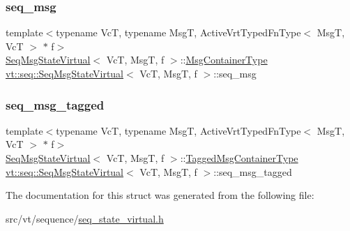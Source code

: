 \subsubsection{\texorpdfstring{seq\+\_\+msg}{seq\_msg}}
{\footnotesize\ttfamily template$<$typename VcT, typename MsgT, Active\+Vrt\+Typed\+Fn\+Type$<$ Msg\+T, Vc\+T $>$ $\ast$ f$>$ \\
\hyperlink{structvt_1_1seq_1_1_seq_msg_state_virtual}{Seq\+Msg\+State\+Virtual}$<$ VcT, MsgT, f $>$\+::\hyperlink{structvt_1_1seq_1_1_seq_msg_state_virtual_a04ba59629edd91369fb4dcb17784c370}{Msg\+Container\+Type} \hyperlink{structvt_1_1seq_1_1_seq_msg_state_virtual}{vt\+::seq\+::\+Seq\+Msg\+State\+Virtual}$<$ VcT, MsgT, f $>$\+::seq\+\_\+msg\hspace{0.3cm}{\ttfamily [static]}}

\mbox{\label{structvt_1_1seq_1_1_seq_msg_state_virtual_af7c7ba482e8b8833b9a92614150bffd0}} 
\subsubsection{\texorpdfstring{seq\+\_\+msg\+\_\+tagged}{seq\_msg\_tagged}}
{\footnotesize\ttfamily template$<$typename VcT, typename MsgT, Active\+Vrt\+Typed\+Fn\+Type$<$ Msg\+T, Vc\+T $>$ $\ast$ f$>$ \\
\hyperlink{structvt_1_1seq_1_1_seq_msg_state_virtual}{Seq\+Msg\+State\+Virtual}$<$ VcT, MsgT, f $>$\+::\hyperlink{structvt_1_1seq_1_1_seq_msg_state_virtual_a9760353cffc9071f3e24054562a86db3}{Tagged\+Msg\+Container\+Type} \hyperlink{structvt_1_1seq_1_1_seq_msg_state_virtual}{vt\+::seq\+::\+Seq\+Msg\+State\+Virtual}$<$ VcT, MsgT, f $>$\+::seq\+\_\+msg\+\_\+tagged\hspace{0.3cm}{\ttfamily [static]}}



The documentation for this struct was generated from the following file\+:\begin{DoxyCompactItemize}
\item 
src/vt/sequence/\hyperlink{seq__state__virtual_8h}{seq\+\_\+state\+\_\+virtual.\+h}\end{DoxyCompactItemize}
